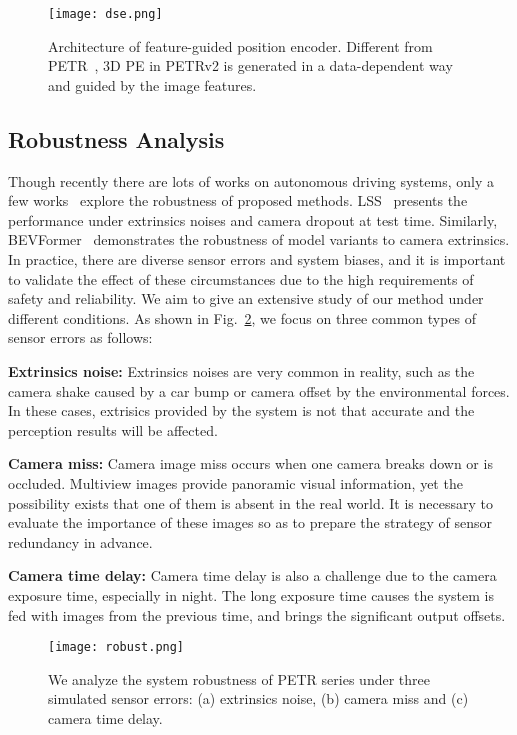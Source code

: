 \documentclass[10pt,twocolumn,letterpaper]{article}
\begin{document}
\begin{figure}[h]
	\centering  
	\texttt{[image: dse.png]}
	\caption{Architecture of feature-guided position encoder. Different from PETR~\cite{liu2022petr}, 3D PE in PETRv2 is generated in a data-dependent way and guided by the image features.
    }  
	\label{dse}
\end{figure}

\subsection{Robustness Analysis}


Though recently there are lots of works on autonomous driving systems, only a few works~\cite{philion2020lift,li2022bevformer} explore the robustness of proposed methods.
LSS~\cite{philion2020lift} presents the performance under extrinsics noises and camera dropout at test time. 
Similarly, BEVFormer~\cite{li2022bevformer} demonstrates the robustness of model variants to camera extrinsics.
In practice, there are diverse sensor errors and system biases, and it is important to validate the effect of these circumstances due to the high requirements of safety and reliability. 
We aim to give an extensive study of our method under different conditions. As shown in Fig.~\ref{fig:robust}, 
we focus on three common types of sensor errors as follows:

\noindent \textbf{Extrinsics noise:} Extrinsics noises are very common in reality, such as the camera shake caused by a car bump or camera offset by the environmental forces. In these cases, extrisics provided by the system is not that accurate and the perception results will be affected.

\noindent \textbf{Camera miss:} Camera image miss occurs when one camera breaks down or is occluded. Multiview images provide panoramic visual information, yet the possibility exists that one of them is absent in the real world. It is necessary to evaluate the importance of these images so as to prepare the strategy of sensor redundancy in advance.

\noindent \textbf{Camera time delay:} Camera time delay is also a challenge due to the camera exposure time, especially in night. The long exposure time causes the system is fed with images from the previous time, and brings the significant output offsets.

\begin{figure}[h]
	\centering  
\texttt{[image: robust.png]}
	\caption{We analyze the system robustness of PETR series under three simulated sensor errors: (a) extrinsics noise, (b) camera miss and (c) camera time delay.}  
	\label{fig:robust}
\end{figure}
\end{document}
